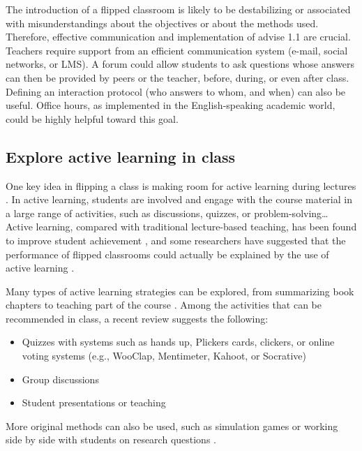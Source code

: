 \documentclass[10pt,letterpaper]{article}
\begin{document}
The introduction of a flipped classroom is likely to be destabilizing or associated with misunderstandings about the objectives or about the methods used. Therefore, effective communication \cite{lo_critical_2017} and implementation of advise 1.1 are crucial. 
Teachers require support from an efficient communication system (e-mail, social networks, or LMS). 
A forum could allow students to ask questions whose answers can then be provided by peers  or the teacher, before, during, or even after class. Defining an interaction protocol (who answers to whom, and when) can also be useful. 
Office hours, as implemented in the English-speaking academic world, could be highly helpful toward this goal.


\subsection{Explore active learning in class}

One key idea in flipping a class is making room for active learning during lectures \cite{delozier_flipped_2017}.
In active learning, students are involved and engage with the course material in a large range of activities, such as discussions, quizzes, or problem-solving\ldots{} 
Active learning, compared with traditional lecture-based teaching, has been found to improve student achievement \cite{freeman_reply_2014}, and some researchers have suggested that the performance of flipped classrooms 
could actually be explained by the use of active learning \cite{jensen_improvements_2015}.

Many types of active learning strategies can be explored, from summarizing book chapters to teaching part of the course \cite{fiorella_eight_2016}. Among the activities that can be recommended in class, a recent review \cite{delozier_flipped_2017} suggests the following:

\begin{itemize}

\item Quizzes with systems such as hands up, Plickers cards, clickers, 
or online voting systems (e.g., WooClap, Mentimeter, Kahoot, or Socrative)

\item Group discussions

\item Student presentations or teaching

\end{itemize}


More original methods can also be used, such as simulation games \cite{taly2019molecular} or working side by side 
with students on research questions \cite{mazzanti2017can}. 
\end{document}
